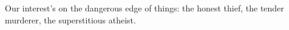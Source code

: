 \documentclass[MAIN]{subfiles}
\begin{document}
Our interest's on the dangerous edge of things: the honest thief, the tender murderer, the superstitious atheist.
\end{document}
